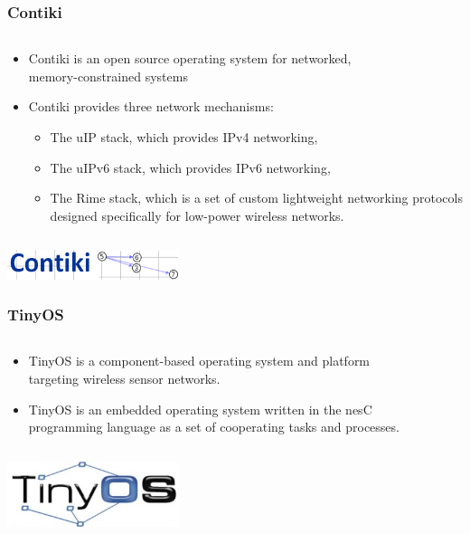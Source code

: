 \documentclass{beamer}
\begin{document}
\begin{frame}
	\frametitle{Contiki}
	\begin{columns}[c]
		\begin{column}{30cm}
			\vspace{.1cm}
			\begin{itemize}
				\justifying
				\item Contiki is an open source operating system for \textcolor{TextOrange}{networked},\\
				\textcolor{TextOrange}{memory-constrained} systems
				\item Contiki provides three network mechanisms:
				\begin{itemize}
					\justifying
					\item The uIP stack, which provides IPv4 networking,
					\item The uIPv6 stack, which provides IPv6 networking,
					\item The Rime stack, which is a set of custom lightweight networking protocols\\
					designed specifically for low-power wireless networks.
				\end{itemize}
			\end{itemize}
		\end{column}
	\end{columns}
	\vspace{.5cm}
	\hspace*{5.5cm} \includegraphics[width=5cm]{figs/contiki-logo.png}
\end{frame}

\begin{frame}
	\frametitle{TinyOS}
	\begin{columns}[c]
		\begin{column}{30cm}
			\vspace{.1cm}
			\begin{itemize}
				\justifying
				\item TinyOS is a \textcolor{TextOrange}{component-based} operating system and platform\\
				targeting wireless sensor networks.
				\item TinyOS is an embedded operating system written in the \textcolor{TextOrange}{nesC}\\
				\textcolor{TextOrange}{programming language} as a set of cooperating tasks and processes.
			\end{itemize}
		\end{column}
	\end{columns}
	\vspace{.5cm}
	\hspace*{5.5cm} \includegraphics[width=5cm]{figs/tinyos-logo.jpg}
\end{frame}
\end{document}
